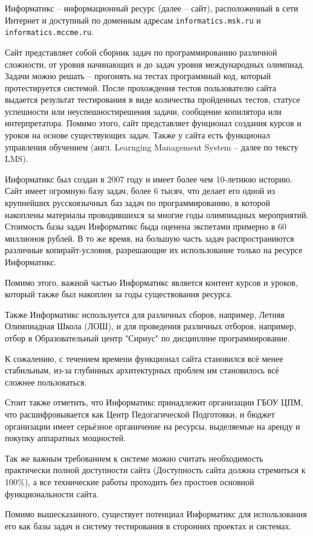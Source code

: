 
Информатикс -- информационный ресурс (далее -- сайт), расположенный в сети Интернет 
и доступный по доменным адресам \texttt{informatics.msk.ru} и \texttt{informatics.mccme.ru}.

Сайт представляет собой сборник задач по программированию различной сложности, от уровня начинающих и до задач уровня международных олимпиад. 
Задачи можно решать -- прогонять на тестах программный код, который протестируется системой. 
После прохождения тестов пользователю сайта выдается результат тестирования в виде количества пройденных тестов, 
статусе успешности или неуспешностирешения задачи, сообщение копилятора или интерпретатора.
Помимо этого, сайт представляет фунционал создания курсов и уроков на основе существующих задач.
Также у сайта есть функционал управления обучением (англ. Learnging Management System -- далее по тексту LMS).

Информатикс был создан в 2007 году и имеет более чем 10-летнюю историю.
Сайт имеет огромную базу задач, более 6 тысяч, 
что делает его одной из крупнейших русскоязычных баз задач по программированию, в которой накоплены материалы проводившихся за многие годы олимпиадных мероприятий. 
Стоимость базы задач Информатикс быда оценена экспетами примерно в 60 миллионов рублей. 
В то же время, на большую часть задач распространиются различные копирайт-условия, разрешающие их использование только на ресурсе Информатикс.

Помимо этого, важной частью Информатикс является контент курсов и уроков, 
который также был накоплен за годы существования ресурса.

Также Информатикс используется для различных сборов, например, Летняя Олимпиадная Школа (ЛОШ), 
и для проведения различных отборов, например, отбор в Образовательный центр "Сириус" по дисциплине программирование\cite{inf_tinkoff}.

К сожалению, с течением времени функционал сайта становился всё менее стабильным, 
из-за глубинных архитектурных проблем им становилось всё сложнее пользоваться\cite{inf_not_working}.

Стоит также отметить, что Информатикс принадлежит организации ГБОУ ЦПМ, что расшифровывается как Центр Педогагической Подготовки,
и бюджет организации имеет серьёзное органичение на ресурсы, выделяемые на аренду и покупку аппаратных мощностей.

Так же важным требованием к системе можно считать необходимость практически полной доступности сайта (Доступность сайта должна стремиться к 100\%), 
а все технические работы проходить без простоев основной функциональности сайта.

Помимо вышесказанного, существует потенциал Информатикс для использования его как базы задач и систему тестирования в сторонних проектах и системах.